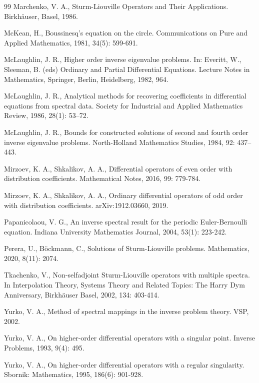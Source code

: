 \documentclass[reqno,12pt,centertags]{amsart}
\numberwithin{equation}{section}
\theoremstyle{definition}
\begin{document}
\begin{thebibliography}{99}
 Marchenko, V. A., Sturm-Liouville Operators and Their Applications. Birkh\"auser, Basel, 1986.

 McKean, H., Boussinesq's equation on the circle. Communications on Pure and Applied Mathematics, 1981, 34(5): 599-691.

 McLaughlin, J. R., Higher order inverse eigenvalue problems. In: Everitt, W., Sleeman, B.
(eds) Ordinary and Partial Diﬀerential Equations. Lecture Notes in Mathematics, 
Springer, Berlin, Heidelberg, 1982, 964.

 McLaughlin, J. R., Analytical methods for recovering coefficients in differential equations
from spectral data. Society for Industrial and Applied Mathematics Review, 1986, 28(1): 53–72.

 McLaughlin, J. R., Bounds for constructed solutions of second and fourth order inverse
eigenvalue problems. North-Holland Mathematics Studies, 1984, 92: 437–443.

 Mirzoev, K. A., Shkalikov, A. A., Differential operators of even order with distribution coefficients. Mathematical Notes, 2016, 99: 779-784.

 Mirzoev, K. A., Shkalikov, A. A., Ordinary differential operators of odd order with distribution coefficients. arXiv:1912.03660, 2019.

Papanicolaou, V. G.,	An inverse spectral result for the periodic Euler-Bernoulli equation. Indiana University Mathematics Journal, 2004, 53(1): 223-242.

Perera, U., B\"ockmann, C., Solutions of Sturm-Liouville problems. Mathematics, 2020, 8(11): 2074.

Tkachenko, V., Non-selfadjoint Sturm-Liouville operators with multiple spectra. In Interpolation Theory, Systems Theory and Related Topics: The Harry Dym Anniversary,  Birkhäuser Basel, 2002, 134: 403-414.  


 Yurko, V. A., Method of spectral mappings in the inverse problem theory. VSP, 2002.

 Yurko, V. A., On higher-order differential operators with a singular point. Inverse Problems, 1993, 9(4): 495.

 Yurko, V. A., On higher-order differential operators with a regular singularity. Sbornik: Mathematics, 1995, 186(6): 901-928.		

\end{thebibliography}
\end{document}
